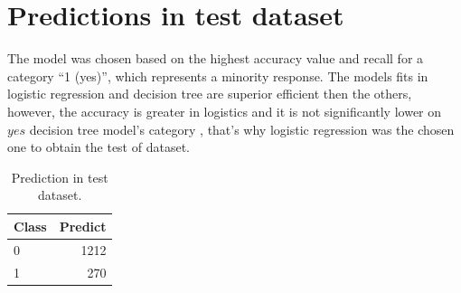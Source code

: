 \documentclass[12pt,]{article}
\begin{document}
\hypertarget{predictions-in-test-dataset}{%
\section{Predictions in test
dataset}\label{predictions-in-test-dataset}}

\quad The model was chosen based on the highest accuracy value and
recall for a category ``1 (yes)'', which represents a minority response.
The models fits in logistic regression and decision tree are superior
efficient then the others, however, the accuracy is greater in logistics
and it is not significantly lower on \(yes\) decision tree model's
category , that's why logistic regression was the chosen one to obtain
the test of dataset.

\begin{table}[H]

\caption{\label{tab:unnamed-chunk-8}Prediction in test dataset.}
\centering
\fontsize{11}{13}\selectfont
\begin{tabular}[t]{lr}
\toprule
Class & Predict\\
\midrule
0 & 1212\\
1 & 270\\
\bottomrule
\end{tabular}
\end{table}
\end{document}

